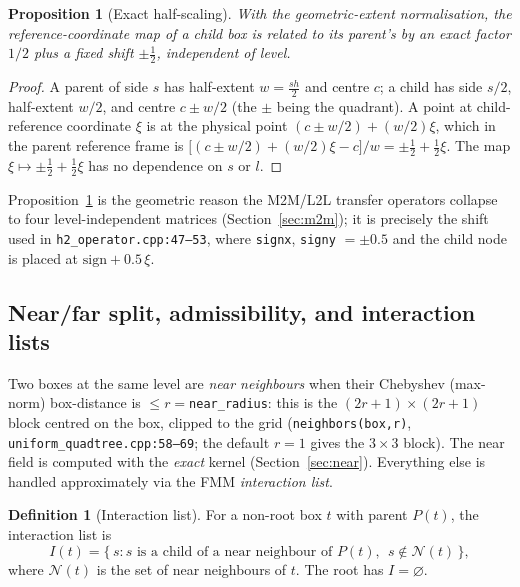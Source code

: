 \documentclass[11pt,a4paper]{article}
\newcommand{\code}[1]{\texttt{#1}}
\newtheorem{proposition}{Proposition}
\theoremstyle{definition}
\newtheorem{definition}{Definition}
\theoremstyle{remark}
\begin{document}
\begin{proposition}[Exact half-scaling]
\label{prop:halfscale}
With the geometric-extent normalisation, the reference-coordinate map of a child
box is related to its parent's by an exact factor $1/2$ plus a fixed shift
$\pm\tfrac12$, independent of level.
\end{proposition}
\begin{proof}
A parent of side $s$ has half-extent $w=\tfrac{s h}{2}$ and centre $c$; a child
has side $s/2$, half-extent $w/2$, and centre $c\pm w/2$ (the $\pm$ being the
quadrant). A point at child-reference coordinate $\xi$ is at the physical point
$(c\pm w/2)+(w/2)\xi$, which in the parent reference frame is
$\big[(c\pm w/2)+(w/2)\xi - c\big]/w = \pm\tfrac12 + \tfrac12\xi$. The map
$\xi\mapsto \pm\tfrac12+\tfrac12\xi$ has no dependence on $s$ or $l$.
\end{proof}

Proposition~\ref{prop:halfscale} is the geometric reason the M2M/L2L transfer
operators collapse to four level-independent matrices
(Section~\ref{sec:m2m}); it is precisely the shift used in
\code{h2\_operator.cpp:47--53}, where \code{signx}, \code{signy}
$=\pm0.5$ and the child node is placed at $\text{sign}+0.5\,\xi$.

\subsection{Near/far split, admissibility, and interaction lists}

Two boxes at the same level are \emph{near neighbours} when their Chebyshev
(max-norm) box-distance is $\le r=$\code{near\_radius}: this is the
$(2r+1)\times(2r+1)$ block centred on the box, clipped to the grid
(\code{neighbors(box,r)}, \code{uniform\_quadtree.cpp:58--69}; the default $r=1$
gives the $3\times3$ block). The near field is computed with the \emph{exact}
kernel (Section~\ref{sec:near}). Everything else is handled approximately via the
FMM \emph{interaction list}.

\begin{definition}[Interaction list]
\label{def:ilist}
For a non-root box $t$ with parent $P(t)$, the interaction list is
\begin{equation}
  I(t) = \big\{\, s : s \text{ is a child of a near neighbour of } P(t),\ \
                    s \notin \mathcal N(t) \,\big\},
  \label{eq:ilist}
\end{equation}
where $\mathcal N(t)$ is the set of near neighbours of $t$. The root has
$I=\varnothing$.
\end{definition}
\end{document}
